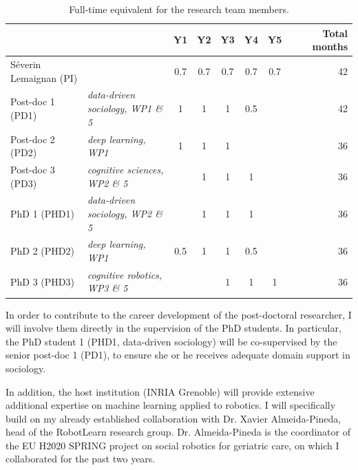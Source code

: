 \begin{table}[h!]
    \centering
\begin{tabular}{@{}llccccccr@{}}
\toprule
    \textit{\textbf{}}     &       & \textbf{Y1} & \textbf{Y2} & \textbf{Y3} & \textbf{Y4} & \textbf{Y5} &  & \textbf{Total months} \\ \midrule
    Séverin Lemaignan (PI) &                                           & 0.7  & 0.7  & 0.7  & 0.7 & 0.7  &  & 42                    \\ \midrule
    Post-doc 1 (PD1)       & \textit{data-driven sociology, WP1 \& 5}  & 1    & 1    & 1    & 0.5 &      &  & 42                    \\
    Post-doc 2 (PD2)       & \textit{deep learning, WP1}               & 1    & 1    & 1    &     &      &  & 36                    \\
    Post-doc 3 (PD3)       & \textit{cognitive sciences, WP2 \& 5}     &      & 1    & 1    & 1   &      &  & 36                    \\ \midrule
    PhD 1 (PHD1)           & \textit{data-driven sociology, WP2 \& 5}  &      & 1    & 1    & 1   &      &  & 36                    \\
    PhD 2 (PHD2)           & \textit{deep learning, WP1}               & 0.5  & 1    & 1    & 0.5 &      &  & 36                    \\ 
    PhD 3 (PHD3)           & \textit{cognitive robotics, WP3 \& 5}     &      &      & 1    & 1   & 1    &  & 36                    \\ \bottomrule
\end{tabular}
    \caption{Full-time equivalent for the research team members.}
    \label{time-allocation-team}
\end{table}

In order to contribute to the career development of the post-doctoral
researcher, I will involve them directly in the supervision of the PhD
students. In particular, the PhD student 1 (PHD1, data-driven sociology) will
be co-supervised by the senior post-doc 1 (PD1), to ensure she or he receives
adequate domain support in sociology.

In addition, the host institution (INRIA Grenoble) will provide extensive
additional expertise on machine learning applied to robotics. I will specifically build on
my already established collaboration with Dr. Xavier Almeida-Pineda, head of the
RobotLearn research group. Dr. Almeida-Pineda is the coordinator of the EU H2020
SPRING project on social robotics for geriatric care, on which I collaborated
for the past two years.


